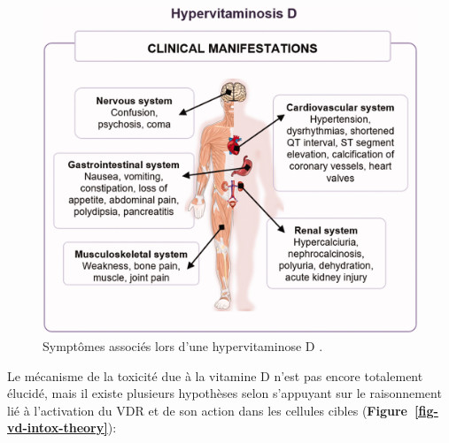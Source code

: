 \documentclass[
  a4paper,
  DIV=11,
  numbers=noendperiod,
  listof=totoc]{scrreprt}
\begin{document}
\begin{figure}

{\centering \includegraphics{figures/hypervitaminosis-d.jpg}

}

\caption[Symptômes associés lors d'une hypervitaminose
D.]{\label{fig-hypervitaminose-d}Symptômes associés lors d'une
hypervitaminose D \autocite{Janoušek.2022}.}

\end{figure}

Le mécanisme de la toxicité due à la vitamine D n'est pas encore
totalement élucidé, mais il existe plusieurs hypothèses selon
\textcite{Jones.2008} s'appuyant sur le raisonnement lié à l'activation
du \ac{VDR} et de son action dans les cellules cibles
\autocite{Alshahrani.2013,Janoušek.2022}
(\textbf{Figure~\ref{fig-vd-intox-theory}}):
\end{document}

